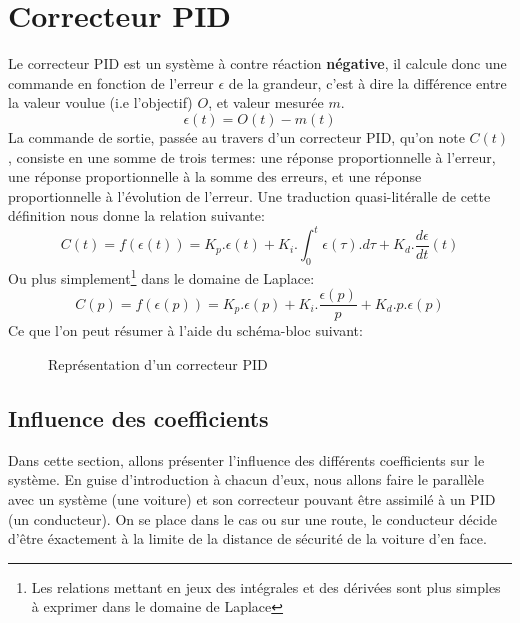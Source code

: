     \section{Correcteur PID}
        Le correcteur PID est un système à contre réaction \textbf{négative}, il calcule donc une commande en fonction de l'erreur $\epsilon$ de la grandeur, c'est à dire la différence entre la valeur voulue (i.e l'objectif) $O$, et valeur mesurée $m$.
        \begin{equation}
            \epsilon (t) = O(t) - m(t)
        \end{equation}
        La commande de sortie, passée au travers d'un correcteur PID, qu'on note $C(t)$, consiste en une somme de trois termes: une réponse proportionnelle à l'erreur, une réponse proportionnelle à la somme des erreurs, et une réponse proportionnelle à l'évolution de l'erreur. Une traduction quasi-litéralle de cette définition nous donne la relation suivante:
        \begin{equation}
            C(t) = f(\epsilon(t)) = K_p . \epsilon(t) + K_i . \int_{0}^{t}\epsilon(\tau).d\tau + K_d . \frac{d\epsilon}{dt}(t)
        \end{equation}
        Ou plus simplement\footnote{Les relations mettant en jeux des intégrales et des dérivées sont plus simples à exprimer dans le domaine de Laplace} dans le domaine de Laplace:
        \begin{equation}
            C(p) = f(\epsilon(p)) = K_p . \epsilon(p) + K_i . \frac{\epsilon(p)}{p} + K_d.p.\epsilon(p)
        \end{equation}
        Ce que l'on peut résumer à l'aide du schéma-bloc suivant:
        \begin{figure}[h]
            \centering
            \caption{Représentation d'un correcteur PID}
        \end{figure}

        \newpage
        \subsection{Influence des coefficients}
            Dans cette section, allons présenter l'influence des différents coefficients sur le système. En guise d'introduction à chacun d'eux, nous allons faire le parallèle avec un système (une voiture) et son correcteur pouvant être assimilé à un PID (un conducteur). On se place dans le cas ou sur une route, le conducteur décide d'être éxactement à la limite de la distance de sécurité de la voiture d'en face.

